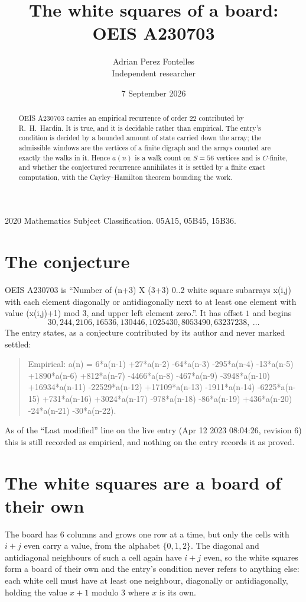 \documentclass[11pt,a4paper]{article}
\title{The white squares of a board: OEIS A230703}
\author{Adrian Perez Fontelles\\ \small Independent researcher}
\date{7 September 2026}
\theoremstyle{plain}
\theoremstyle{definition}
\begin{document}
\maketitle

\begin{abstract}
OEIS A230703 carries an empirical recurrence of order $22$ contributed by R.~H.~Hardin. It is
true, and it is decidable rather than empirical. The entry's condition is decided by a bounded amount of state carried down the array; the
admissible windows are the vertices of a finite digraph and the arrays counted are exactly the
walks in it. Hence $a(n)$ is a walk count on $S=56$ vertices and is $C$-finite, and whether the
conjectured recurrence annihilates it is settled by a finite exact computation, with the
Cayley--Hamilton theorem bounding the work.
\end{abstract}

\noindent\small 2020 Mathematics Subject Classification. 05A15, 05B45, 15B36.\normalsize

\section{The conjecture}

OEIS A230703 is ``Number of (n+3) X (3+3) 0..2 white square subarrays x(i,j) with each element diagonally or antidiagonally next to at least one element with value (x(i,j)+1) mod 3, and upper left element zero.''. It has offset $1$ and begins
\[
30, 244, 2106, 16536, 130446, 1025430, 8053490, 63237238,\ \dots
\]
The entry states, as a conjecture contributed by its author and never marked settled:
\begin{quote}
Empirical: a(n) = 6*a(n-1) +27*a(n-2) -64*a(n-3) -295*a(n-4) -13*a(n-5) +1890*a(n-6) +812*a(n-7) -4466*a(n-8) -467*a(n-9) -3948*a(n-10) +16934*a(n-11) -22529*a(n-12) +17109*a(n-13) -1911*a(n-14) -6225*a(n-15) +731*a(n-16) +3024*a(n-17) -978*a(n-18) -86*a(n-19) +436*a(n-20) -24*a(n-21) -30*a(n-22).
\end{quote}
As of the ``Last modified'' line on the live entry (Apr 12 2023 08:04:26, revision 6) this is still
recorded as empirical, and nothing on the entry records it as proved.

\section{The white squares are a board of their own}

The board has $6$ columns and grows one row at a time, but only the cells with $i+j$ even carry a value, from the alphabet $\{0,1,2\}$. The diagonal and antidiagonal neighbours of such a cell again have $i+j$ even, so the white squares form a board of their own and the entry's condition never refers to anything else: each white cell must have at least one neighbour, diagonally or antidiagonally, holding the value $x+1$ modulo $3$ where $x$ is its own.
\end{document}
